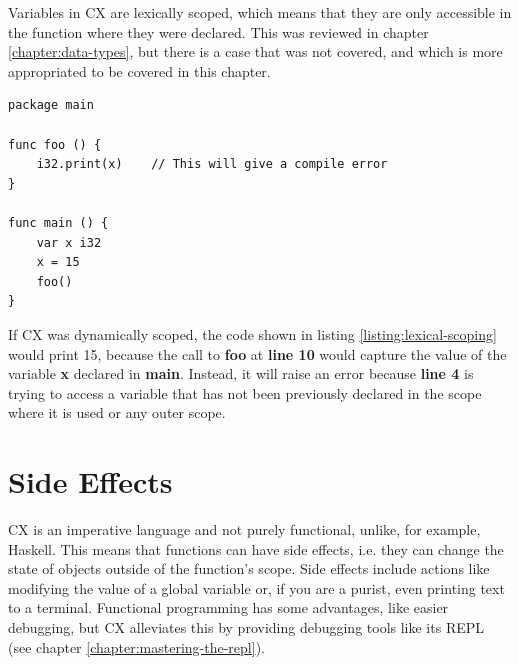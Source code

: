 \documentclass[11pt,fleqn,openany]{book} %
\begin{document}
Variables in CX are lexically scoped, which means that they are only accessible in the function where they were declared. This was reviewed in chapter \ref{chapter:data-types}, but there is a case that was not covered, and which is more appropriated to be covered in this chapter.

\begin{lstlisting}[caption={Lexical scoping},captionpos=b,label={listing:lexical-scoping}]
package main

func foo () {
	i32.print(x)    // This will give a compile error
}

func main () {
	var x i32
    x = 15
    foo()
}
\end{lstlisting}

If CX was dynamically scoped, the code shown in listing \ref{listing:lexical-scoping} would print 15, because the call to \textbf{foo} at \textbf{line 10} would capture the value of the variable \textbf{x} declared in \textbf{main}. Instead, it will raise an error because \textbf{line 4} is trying to access a variable that has not been previously declared in the scope where it is used or any outer scope.

\section{Side Effects}


CX is an imperative language and not purely functional, unlike, for example, Haskell. This means that functions can have side effects, i.e. they can change the state of objects outside of the function's scope. Side effects include actions like modifying the value of a global variable or, if you are a purist, even printing text to a terminal. Functional programming has some advantages, like easier debugging, but CX alleviates this by providing debugging tools like its REPL (see chapter \ref{chapter:mastering-the-repl}).%
\end{document}
